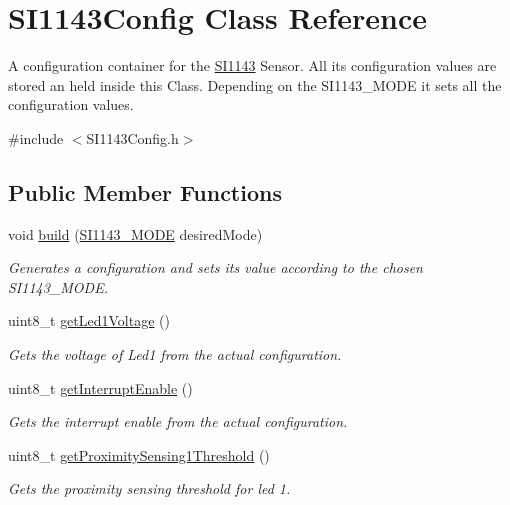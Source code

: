 \hypertarget{class_s_i1143_config}{}\section{S\+I1143\+Config Class Reference}
\label{class_s_i1143_config}


A configuration container for the \hyperlink{class_s_i1143}{S\+I1143} Sensor. All its configuration values are stored an held inside this Class. Depending on the S\+I1143\+\_\+\+M\+O\+D\+E it sets all the configuration values.  




{\ttfamily \#include $<$S\+I1143\+Config.\+h$>$}

\subsection*{Public Member Functions}
\begin{DoxyCompactItemize}
\item 
void \hyperlink{class_s_i1143_config_ad052889f8a003ad8a8203fa43843cc08}{build} (\hyperlink{_s_i1143_config_8h_ae6d915c2410b566eab9cc10516661ecd}{S\+I1143\+\_\+\+M\+O\+D\+E} desired\+Mode)
\begin{DoxyCompactList}\small\item\em Generates a configuration and sets its value according to the chosen S\+I1143\+\_\+\+M\+O\+D\+E. \end{DoxyCompactList}\item 
uint8\+\_\+t \hyperlink{class_s_i1143_config_a3b9e1efcd4179023c7f5e82f54188c03}{get\+Led1\+Voltage} ()
\begin{DoxyCompactList}\small\item\em Gets the voltage of Led1 from the actual configuration. \end{DoxyCompactList}\item 
uint8\+\_\+t \hyperlink{class_s_i1143_config_a14be800a204416b1d29392d983b34e9c}{get\+Interrupt\+Enable} ()
\begin{DoxyCompactList}\small\item\em Gets the interrupt enable from the actual configuration. \end{DoxyCompactList}\item 
uint8\+\_\+t \hyperlink{class_s_i1143_config_a741e9901a3d4beaaa6311faa4a14b845}{get\+Proximity\+Sensing1\+Threshold} ()
\begin{DoxyCompactList}\small\item\em Gets the proximity sensing threshold for led 1. \end{DoxyCompactList}\end{DoxyCompactItemize}


